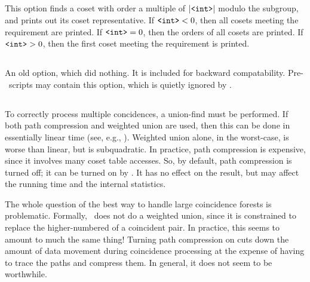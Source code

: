 \subsection{}

This option finds a coset with order a multiple of $|\texttt{<int>}|$ modulo
  the subgroup, and prints out its coset representative.
If $\texttt{<int>} < 0$, then all cosets meeting the requirement are printed.
If $\texttt{<int>} = 0$, then the orders of all cosets are printed.
If $\texttt{<int>} > 0$, then the first coset meeting the requirement is
  printed.

\subsection{}

An old option, which did nothing.
It is included for backward compatability.
Pre-\acet\ scripts may contain this option, which is quietly ignored
  by \acet.

\subsection{}

To correctly process multiple concidences, a union-find must be performed.
If both path compression and weighted union are used, then this can be
  done in essentially linear time (see, e.g., \cite{CLR90}).
Weighted union alone, in the worst-case, is worse than linear, but is
  subquadratic.
In practice, path compression is expensive, since it involves many coset
  table accesses.
So, by default, path compression is turned off; it can be turned on by
  .
It has no effect on the result, but may affect the running time and the
  internal statistics.

The whole question of the best way to handle large coincidence forests is
  problematic.
Formally, \ace\ does not do a weighted union, since it is constrained to
  replace the higher-numbered of a coincident pair.
In practice, this seems to amount to much the same thing!
Turning path compression on cuts down the amount of data movement during
  coincidence processing at the expense of having to trace the paths and
  compress them.
In general, it does not seem to be worthwhile.

\subsection{}


